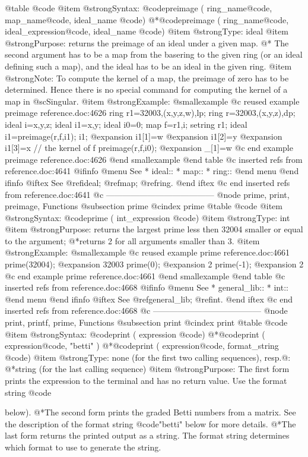 {@table @code
@item @strong{Syntax:}
@code{preimage (} ring_name@code{,} map_name@code{,} ideal_name @code{)}
@*@code{preimage (} ring_name@code{,} ideal_expression@code{,} ideal_name @code{)}
@item @strong{Type:}
ideal
@item @strong{Purpose:}
returns the preimage of an ideal under a given map.
@*
The second argument has to be a map from the basering to the given ring
(or an ideal defining such a map),
and the ideal has to be an ideal in the given ring.
@item @strong{Note:}
To compute the kernel of a map, the preimage of zero has to be determined.
Hence there is no special command for computing the kernel of a map in
@sc{Singular}.
@item @strong{Example:}
@smallexample
@c reused example preimage reference.doc:4626 
  ring r1=32003,(x,y,z,w),lp;
  ring r=32003,(x,y,z),dp;
  ideal i=x,y,z;
  ideal i1=x,y;
  ideal i0=0;
  map f=r1,i;
  setring r1;
  ideal i1=preimage(r,f,i1);
  i1;
@expansion{} i1[1]=w
@expansion{} i1[2]=y
@expansion{} i1[3]=x
  // the kernel of f
  preimage(r,f,i0);
@expansion{} _[1]=w
@c end example preimage reference.doc:4626
@end smallexample
@end table
@c inserted refs from reference.doc:4641
@ifinfo
@menu
See
* ideal::
* map::
* ring::
@end menu
@end ifinfo
@iftex
See
@ref{ideal};
@ref{map};
@ref{ring}.
@end iftex
@c end inserted refs from reference.doc:4641
@c ---------------------------------------
@node prime, print, preimage, Functions
@subsection prime
@cindex prime
@table @code
@item @strong{Syntax:}
@code{prime (} int_expression @code{)}
@item @strong{Type:}
int
@item @strong{Purpose:}
returns the largest prime less then 32004 smaller or equal to the argument;
@*returns 2 for all arguments smaller than 3.
@item @strong{Example:}
@smallexample
@c reused example prime reference.doc:4661 
  prime(32004);
@expansion{} 32003
  prime(0);
@expansion{} 2
  prime(-1);
@expansion{} 2
@c end example prime reference.doc:4661
@end smallexample
@end table
@c inserted refs from reference.doc:4668
@ifinfo
@menu
See
* general_lib::
* int::
@end menu
@end ifinfo
@iftex
See
@ref{general_lib};
@ref{int}.
@end iftex
@c end inserted refs from reference.doc:4668
@c ---------------------------------------
@node print, printf, prime, Functions
@subsection print
@cindex print
@table @code
@item @strong{Syntax:}
@code{print (} expression @code{)}
@*@code{print (} expression@code{, "betti" )}
@*@code{print (} expression@code{,} format_string @code{)}
@item @strong{Type:}
none (for the first two calling sequences), resp.@:
@*string (for the last calling sequence)
@item @strong{Purpose:}
The first form prints the expression to the terminal and has no return
value. Use the format string @code{%
below).
@*The second form prints the graded Betti numbers from a matrix. See
the description of the format string @code{"betti"} below for more
details.
@*The last form returns the printed output as a string. The format
string determines which format to use to generate the string.

}}
